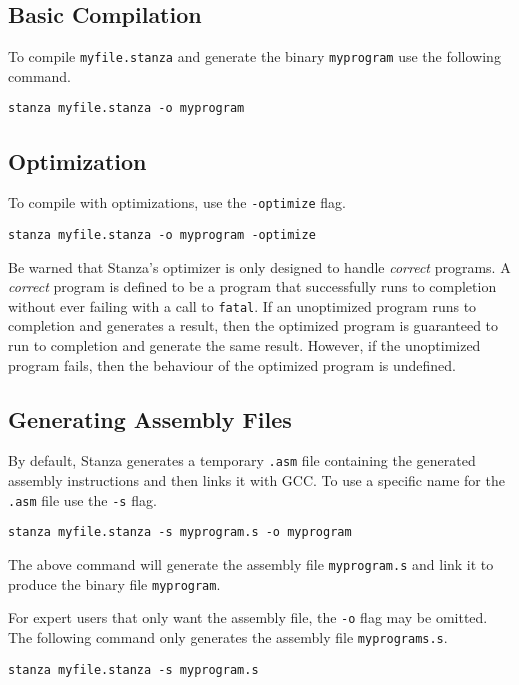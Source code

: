 \documentclass[10pt,oneside]{book}
\begin{document}
\subsection*{Basic Compilation}
To compile \texttt{\frenchspacing myfile.stanza} and generate the binary \texttt{\frenchspacing myprogram} use the following command.
\begin{lstlisting}
stanza myfile.stanza -o myprogram
\end{lstlisting}

\subsection*{Optimization}
To compile with optimizations, use the \texttt{\frenchspacing -optimize} flag. 
\begin{lstlisting}
stanza myfile.stanza -o myprogram -optimize
\end{lstlisting}

Be warned that Stanza's optimizer is only designed to handle {\em correct} programs. A {\em correct} program is defined to be a program that successfully runs to completion without ever failing with a call to \texttt{\frenchspacing fatal}. If an unoptimized program runs to completion and generates a result, then the optimized program is guaranteed to run to completion and generate the same result. However, if the unoptimized program fails, then the behaviour of the optimized program is undefined.

\subsection*{Generating Assembly Files}
By default, Stanza generates a temporary \texttt{\frenchspacing .asm} file containing the generated assembly instructions and then links it with GCC. To use a specific name for the \texttt{\frenchspacing .asm} file use the \texttt{\frenchspacing -s} flag.
\begin{lstlisting}
stanza myfile.stanza -s myprogram.s -o myprogram
\end{lstlisting}
The above command will generate the assembly file \texttt{\frenchspacing myprogram.s} and link it to produce the binary file \texttt{\frenchspacing myprogram}.

For expert users that only want the assembly file, the \texttt{\frenchspacing -o} flag may be omitted. The following command only generates the assembly file \texttt{\frenchspacing myprograms.s}.
\begin{lstlisting}
stanza myfile.stanza -s myprogram.s
\end{lstlisting}
\end{document}
